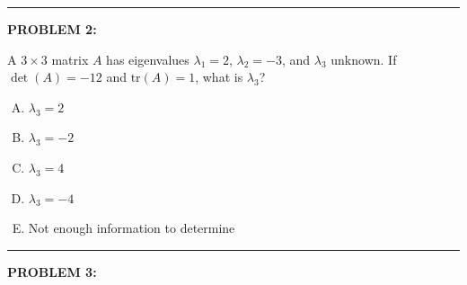 \documentclass[12pt]{amsart}
\newcommand{\divider}{
  \vspace{-1em} %
  \noindent
  \raisebox{-0.15ex}{\textbullet}%
  \hspace{0.5em}%
  \rule[0.5ex]{0.95\textwidth}{1.0pt}%
  \hspace{0.5em}%
  \raisebox{-0.15ex}{\textbullet}%
  \vspace{0em} %
}
\begin{document}

\divider

{\bf PROBLEM 2:}

A $3 \times 3$ matrix $A$ has eigenvalues $\lambda_1 = 2$, $\lambda_2 = -3$, and $\lambda_3$ unknown. 
If $\det(A) = -12$ and $\text{tr}(A) = 1$, what is $\lambda_3$?

\begin{enumerate}[(A)]
\item $\lambda_3 = 2$
\item $\lambda_3 = -2$
\item $\lambda_3 = 4$
\item $\lambda_3 = -4$
\item Not enough information to determine
\end{enumerate}


\divider


{\bf PROBLEM 3:}
\end{document}
